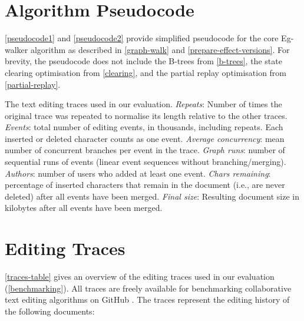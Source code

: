 \documentclass[sigplan,10pt]{acmart}
\newcommand{\algname}{Eg-walker\xspace}
\begin{document}
\newpage
\section{Algorithm Pseudocode}\label{pseudocode-appendix}

\autoref{pseudocode1} and \autoref{pseudocode2} provide simplified pseudocode for the core \algname algorithm as described in \autoref{graph-walk} and \ref{prepare-effect-versions}.
For brevity, the pseudocode does not include the B-trees from \autoref{b-trees}, the state clearing optimisation from \autoref{clearing}, and the partial replay optimisation from \autoref{partial-replay}.

\begin{table}
  \caption{The text editing traces used in our evaluation.
    \emph{Repeats}: Number of times the original trace was repeated to normalise its length relative to the other traces.
    \emph{Events}: total number of editing events, in thousands, including repeats. Each inserted or deleted character counts as one event.
    \emph{Average concurrency}: mean number of concurrent branches per event in the trace.
    \emph{Graph runs}: number of sequential runs of events (linear event sequences without branching/merging).
    \emph{Authors}: number of users who added at least one event.
    \emph{Chars remaining}: percentage of inserted characters that remain in the document (i.e., are never deleted) after all events have been merged.
    \emph{Final size}: Resulting document size in kilobytes after all events have been merged.
  }
  \label{traces-table}
  \footnotesize
\end{table}

\clearpage
\section{Editing Traces}\label{traces-appendix}

\autoref{traces-table} gives an overview of the editing traces used in our evaluation (\autoref{benchmarking}).
All traces are freely available for benchmarking collaborative text editing algorithms on GitHub \cite{editing-traces}.
The traces represent the editing history of the following documents:
\end{document}
